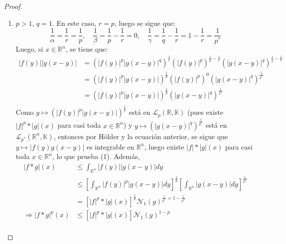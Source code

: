 \documentclass[12pt]{report}
\theoremstyle{largebreak}
\newcommand\abs[1]{\ensuremath{\big|#1\big|}}
\newcommand{\N}[2]{\ensuremath{\mathcal{N}_{#1}\left(#2\right)}}
\begin{document}
\begin{proof}
\begin{enumerate}
            \item $p>1$, $q=1$. En este caso, $r=p$, luego se sigue que:
            \begin{equation*}
                \frac{1}{\alpha}=\frac{1}{r}=\frac{1}{p},\quad \frac{1}{\beta}=\frac{1}{p}-\frac{1}{r}=0,\quad \frac{1}{\gamma}=\frac{1}{q}-\frac{1}{r}=1-\frac{1}{r}=\frac{1}{p^*}
            \end{equation*}
            Luego, si $x\in\mathbb{R}^n$, se tiene que:
            \begin{equation*}
                \begin{split}
                    \abs{f(y)}\abs{g(x-y)}&=\left(\abs{f(y)}^p\abs{g(x-y)}^q\right)^{\frac{1}{r}}\left(\abs{f(y)}^p \right)^{\frac{1}{p}-\frac{1}{r}}\left(\abs{g(x-y)}^q \right)^{\frac{1}{q}-\frac{1}{r}}\\
                    &=\left(\abs{f(y)}^p\abs{g(x-y)}\right)^{\frac{1}{p}}\left(\abs{f(y)}^p \right)^{0}\left(\abs{g(x-y)}^q \right)^{\frac{1}{p^*}}\\
                    &=\left(\abs{f(y)}^p\abs{g(x-y)}\right)^{\frac{1}{p}}\left(\abs{g(x-y)}^q \right)^{\frac{1}{p^*}}\\
                \end{split}
            \end{equation*}
            Como $y\mapsto \left(\abs{f(y)}^p\abs{g(x-y)}\right)^{\frac{1}{p}}$ está en $\mathcal{L}_p(\mathbb{R},\mathbb{K})$ (pues existe $\abs{f}^p*\abs{g}(x)$ para casi toda $x\in\mathbb{R}^n$) y $y\mapsto \left(\abs{g(x-y)}^q \right)^{\frac{1}{p^*}}$ está en $\mathcal{L}_{p^*}(\mathbb{R}^n,\mathbb{K})$, entonces por Hölder y la ecuación anterior, se sigue que $y\mapsto \abs{f(y)g(x-y)}$ es integrable en $\mathbb{R}^n$, luego existe $\abs{f}*\abs{g}(x)$ para casi toda $x\in\mathbb{R}^n$, lo que prueba (1). Además,
            \begin{equation*}
                \begin{split}
                    \abs{f*g}(x)&\leq\int_{\mathbb{R}^n}\abs{f(y)}\abs{g(x-y)}dy\\
                    &\leq\left[\int_{\mathbb{R}^n}\abs{f(y)}^p\abs{g(x-y)}dy \right]^{\frac{1}{p}}\left[\int_{\mathbb{R}^n}\abs{g(x-y)}dy \right]^{\frac{1}{p^*}}\\
                    &=\left[\abs{f}^p*\abs{g}(x) \right]^{\frac{1}{p}}\N{1}{g}^{\frac{1}{p^*}=1-\frac{1}{p^*}}\\
                    \Rightarrow \abs{f*g}^p(x)&\leq \left[\abs{f}^p*\abs{g}(x) \right]\N{1}{g}^{1-p}\\

\end{split}
\end{equation*}
\end{enumerate}
\end{proof}
\end{document}
